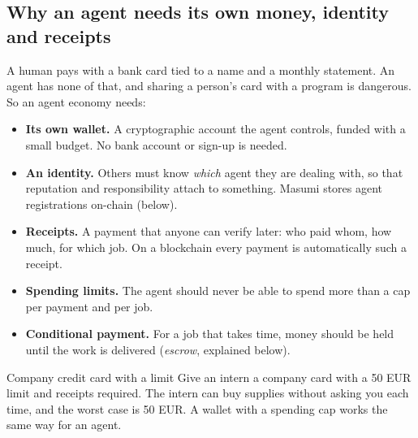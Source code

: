 \subsection{Why an agent needs its own money, identity and receipts}
A human pays with a bank card tied to a name and a monthly statement. An agent has none of that, and sharing a person's card with a program is dangerous. So an agent economy needs:
\begin{itemize}
  \item \textbf{Its own wallet.} A cryptographic account the agent controls, funded with a small budget. No bank account or sign-up is needed.
  \item \textbf{An identity.} Others must know \emph{which} agent they are dealing with, so that reputation and responsibility attach to something. Masumi stores agent registrations on-chain (below).
  \item \textbf{Receipts.} A payment that anyone can verify later: who paid whom, how much, for which job. On a blockchain every payment is automatically such a receipt.
  \item \textbf{Spending limits.} The agent should never be able to spend more than a cap per payment and per job.
  \item \textbf{Conditional payment.} For a job that takes time, money should be held until the work is delivered (\emph{escrow}, explained below).
\end{itemize}

\begin{analogybox}{Company credit card with a limit}
Give an intern a company card with a 50 EUR limit and receipts required. The intern can buy supplies without asking you each time, and the worst case is 50 EUR. A wallet with a spending cap works the same way for an agent.
\end{analogybox}

